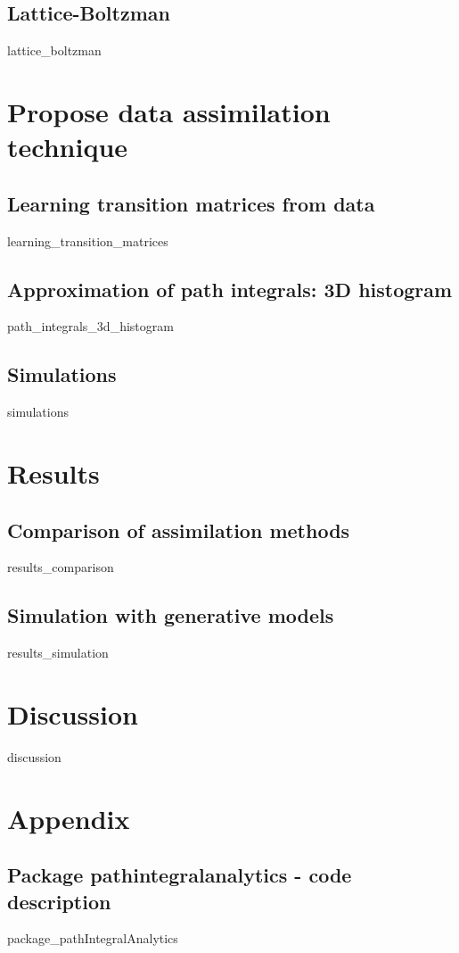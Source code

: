 \documentclass[10pt,a4paper]{report}
\begin{document}
\section{Lattice-Boltzman}
	{lattice_boltzman}



\chapter{Propose data assimilation technique}

\section{Learning transition matrices from data}
	{learning_transition_matrices}

\section{Approximation of path integrals: 3D histogram}
	{path_integrals_3d_histogram}

\section{Simulations}
	{simulations}



\chapter{Results}

\section{Comparison of assimilation methods}
	{results_comparison}

\section{Simulation with generative models}
	{results_simulation}



\chapter{Discussion}

	{discussion}



\chapter{Appendix}

\section{Package pathintegralanalytics - code description}
	{package_pathIntegralAnalytics}
\end{document}
